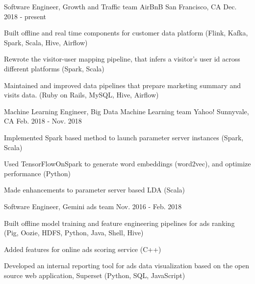 

\begin{cventries}

  \cventry
    {Software Engineer, Growth and Traffic team} %
    {AirBnB} %
    {San Francisco, CA} %
    {Dec. 2018 - present} %
    {
      \begin{cvitems} %
        \item {Built offline and real time components for customer data platform (Flink, Kafka, Spark, Scala, Hive, Airflow)}
        \item {Rewrote the visitor-user mapping pipeline, that infers a visitor's user id across different platforms (Spark, Scala)}
        \item {Maintained and improved data pipelines that prepare marketing summary and visits data. (Ruby on Rails, MySQL, Hive, Airflow)}
      \end{cvitems}
    }

  \cventry
    {Machine Learning Engineer, Big Data Machine Learning team} %
    {Yahoo!} %
    {Sunnyvale, CA} %
    {Feb. 2018 - Nov. 2018} %
    {
      \begin{cvitems} %
        \item {Implemented Spark based method to launch parameter server instances (Spark, Scala)}
        \item {Used TensorFlowOnSpark to generate word embeddings (word2vec), and optimize performance (Python)}
        \item {Made enhancements to parameter server based LDA (Scala)}
      \end{cvitems}
    }

  \cventry
    {Software Engineer, Gemini ads team} %
    {} %
    {} %
    {Nov. 2016 - Feb. 2018} %
    {
      \begin{cvitems} %
        \item {Built offline model training and feature engineering pipelines for ads ranking (Pig, Oozie, HDFS, Python, Java, Shell, Hive)}
        \item {Added features for online ads scoring service (C++)}
        \item {Developed an internal reporting tool for ads data visualization based on the open source web application,
Superset (Python, SQL, JavaScript)}
      \end{cvitems}
    }
    

\end{cventries}
